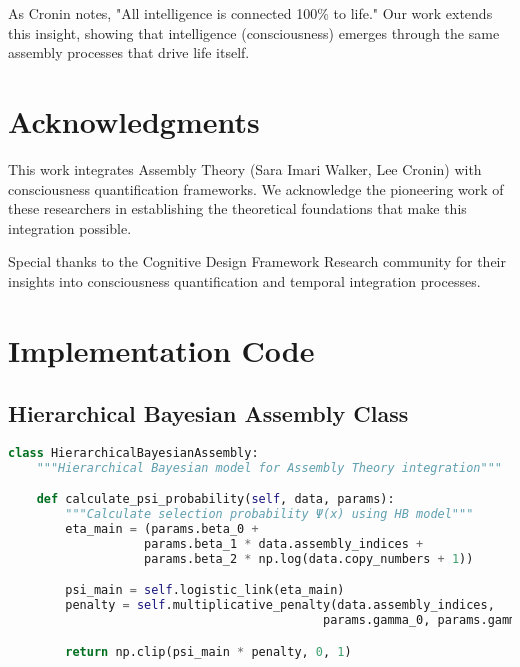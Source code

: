 \documentclass[11pt,a4paper]{article}
\begin{document}
As Cronin notes, "All intelligence is connected 100\% to life." Our work extends this insight, showing that intelligence (consciousness) emerges through the same assembly processes that drive life itself.

\section{Acknowledgments}
\label{sec:acknowledgments}

This work integrates Assembly Theory (Sara Imari Walker, Lee Cronin) with consciousness quantification frameworks. We acknowledge the pioneering work of these researchers in establishing the theoretical foundations that make this integration possible.

Special thanks to the Cognitive Design Framework Research community for their insights into consciousness quantification and temporal integration processes.




\appendix

\section{Implementation Code}
\label{app:implementation}

\subsection{Hierarchical Bayesian Assembly Class}

\begin{lstlisting}[language=Python, caption=Core Implementation]
class HierarchicalBayesianAssembly:
    """Hierarchical Bayesian model for Assembly Theory integration"""

    def calculate_psi_probability(self, data, params):
        """Calculate selection probability Ψ(x) using HB model"""
        eta_main = (params.beta_0 +
                   params.beta_1 * data.assembly_indices +
                   params.beta_2 * np.log(data.copy_numbers + 1))

        psi_main = self.logistic_link(eta_main)
        penalty = self.multiplicative_penalty(data.assembly_indices,
                                            params.gamma_0, params.gamma_1)

        return np.clip(psi_main * penalty, 0, 1)
\end{lstlisting}
\end{document}
